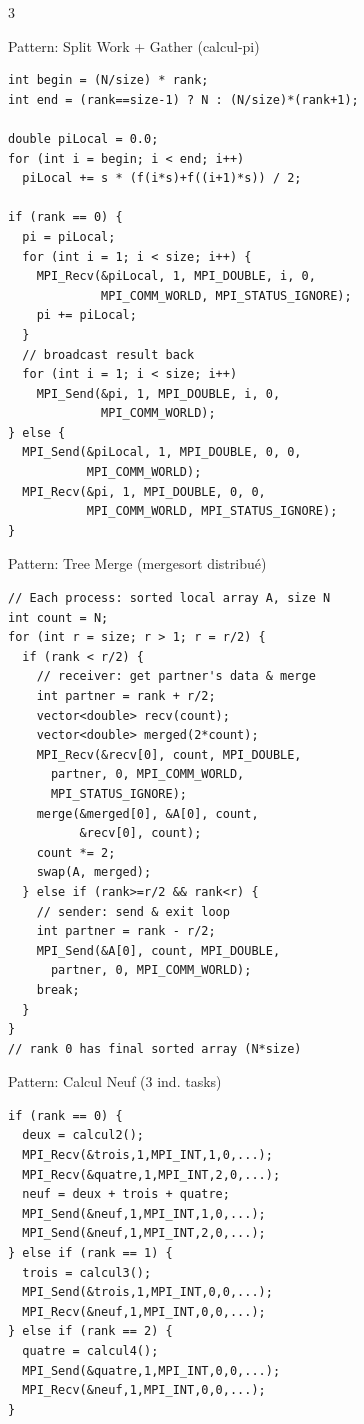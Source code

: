 \documentclass[8pt,a4paper,landscape]{article}
\begin{document}
\begin{multicols}{3}
\begin{accentbox}{Pattern: Split Work + Gather (calcul-pi)}
\begin{lstlisting}
int begin = (N/size) * rank;
int end = (rank==size-1) ? N : (N/size)*(rank+1);

double piLocal = 0.0;
for (int i = begin; i < end; i++)
  piLocal += s * (f(i*s)+f((i+1)*s)) / 2;

if (rank == 0) {
  pi = piLocal;
  for (int i = 1; i < size; i++) {
    MPI_Recv(&piLocal, 1, MPI_DOUBLE, i, 0,
             MPI_COMM_WORLD, MPI_STATUS_IGNORE);
    pi += piLocal;
  }
  // broadcast result back
  for (int i = 1; i < size; i++)
    MPI_Send(&pi, 1, MPI_DOUBLE, i, 0,
             MPI_COMM_WORLD);
} else {
  MPI_Send(&piLocal, 1, MPI_DOUBLE, 0, 0,
           MPI_COMM_WORLD);
  MPI_Recv(&pi, 1, MPI_DOUBLE, 0, 0,
           MPI_COMM_WORLD, MPI_STATUS_IGNORE);
}
\end{lstlisting}
\end{accentbox}

\begin{accentbox}{Pattern: Tree Merge (mergesort distribu\'{e})}
\begin{lstlisting}
// Each process: sorted local array A, size N
int count = N;
for (int r = size; r > 1; r = r/2) {
  if (rank < r/2) {
    // receiver: get partner's data & merge
    int partner = rank + r/2;
    vector<double> recv(count);
    vector<double> merged(2*count);
    MPI_Recv(&recv[0], count, MPI_DOUBLE,
      partner, 0, MPI_COMM_WORLD,
      MPI_STATUS_IGNORE);
    merge(&merged[0], &A[0], count,
          &recv[0], count);
    count *= 2;
    swap(A, merged);
  } else if (rank>=r/2 && rank<r) {
    // sender: send & exit loop
    int partner = rank - r/2;
    MPI_Send(&A[0], count, MPI_DOUBLE,
      partner, 0, MPI_COMM_WORLD);
    break;
  }
}
// rank 0 has final sorted array (N*size)
\end{lstlisting}
\end{accentbox}

\begin{sectionbox}{Pattern: Calcul Neuf (3 ind. tasks)}
\begin{lstlisting}
if (rank == 0) {
  deux = calcul2();
  MPI_Recv(&trois,1,MPI_INT,1,0,...);
  MPI_Recv(&quatre,1,MPI_INT,2,0,...);
  neuf = deux + trois + quatre;
  MPI_Send(&neuf,1,MPI_INT,1,0,...);
  MPI_Send(&neuf,1,MPI_INT,2,0,...);
} else if (rank == 1) {
  trois = calcul3();
  MPI_Send(&trois,1,MPI_INT,0,0,...);
  MPI_Recv(&neuf,1,MPI_INT,0,0,...);
} else if (rank == 2) {
  quatre = calcul4();
  MPI_Send(&quatre,1,MPI_INT,0,0,...);
  MPI_Recv(&neuf,1,MPI_INT,0,0,...);
}
\end{lstlisting}
\end{sectionbox}

\end{multicols}
\end{document}
